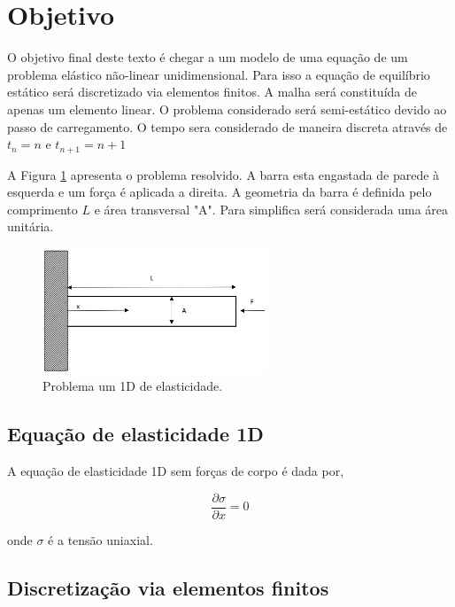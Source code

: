\documentclass[12pt,a4paper]{article}
\newcommand{\dd}[2]{\frac{\partial #1}{\partial #2}}
\begin{document}
	
\section{Objetivo}

O objetivo final deste texto é chegar a um modelo de uma equação de um problema elástico não-linear unidimensional. Para isso a equação de equilíbrio estático será discretizado via elementos finitos. A malha será constituída de apenas um elemento linear. O problema considerado será semi-estático devido ao passo de carregamento. O tempo sera considerado de maneira discreta através de $t_n = n$ e $t_{n+1} = n+1$

A Figura \ref{fig:problema} apresenta o problema resolvido. A barra esta engastada de parede à esquerda e um força é aplicada a direita. A geometria da barra é definida pelo comprimento $L$ e área transversal "A". Para simplifica será considerada uma área unitária.

\begin{figure}[H]
	\centering
	\includegraphics[width=0.6\textwidth]{problema.PNG}
	\caption{Problema um 1D de elasticidade.}
	\label{fig:problema}
\end{figure}

\subsection{Equação de elasticidade 1D}

A equação de elasticidade 1D sem forças de corpo é dada por,

\begin{equation}
	\dd{\sigma}{x} = 0
	\label{eq_equilibrio}
\end{equation}
	
\noindent
onde $\sigma$ é a tensão uniaxial.

\subsection{Discretização via elementos finitos}
\end{document}
